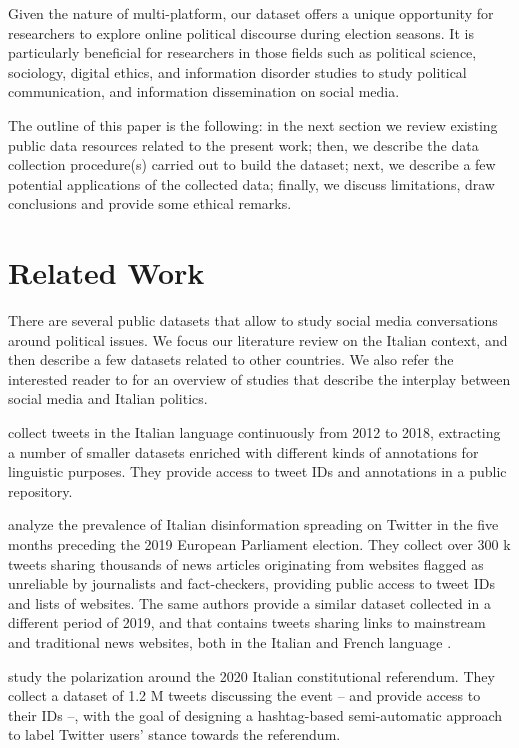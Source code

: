 \documentclass[sigconf,screen]{acmart}
\begin{document}

Given the nature of multi-platform, our dataset offers a unique opportunity for researchers to explore online political discourse during election seasons. It is particularly beneficial for researchers in those fields such as political science, sociology, digital ethics, and information disorder studies to study political communication, and information dissemination on social media.

The outline of this paper is the following: in the next section we review existing public data resources related to the present work; then, we describe the data collection procedure(s) carried out to build the dataset; next, we describe a few potential applications of the collected data; finally, we discuss limitations, draw conclusions and provide some ethical remarks.


\section{Related Work}
There are several public datasets that allow to study social media conversations around political issues. We focus our literature review on the Italian context, and then describe a few datasets related to other countries. We also refer the interested reader to \cite{rossi2021nearly} for an overview of studies that describe the interplay between social media and Italian politics.

\cite{valerio2018long} collect tweets in the Italian language continuously from 2012 to 2018, extracting a number of smaller datasets enriched with different kinds of annotations for linguistic purposes. They provide access to tweet IDs and annotations in a public repository.

\cite{PierriArtoni2020} analyze the prevalence of Italian disinformation spreading on Twitter in the five months preceding the 2019 European Parliament election. They collect over 300 k tweets sharing thousands of news articles originating from websites flagged as unreliable by journalists and fact-checkers, providing public access to tweet IDs and lists of websites. The same authors provide a similar dataset collected in a different period of 2019, and that contains tweets sharing links to mainstream and traditional news websites, both in the Italian and French language \cite{pierri2020diffusion}.

\cite{di2021content} study the polarization around the 2020 Italian constitutional referendum. They collect a dataset of 1.2 M tweets discussing the event -- and provide access to their IDs --, with the goal of designing a hashtag-based semi-automatic approach to label Twitter users' stance towards the referendum.
\end{document}
